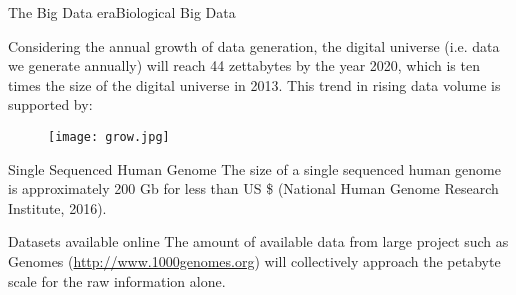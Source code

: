 \documentclass{standalone}
\begin{document}

\begin{frame}{The Big Data era}{Biological Big Data}


  \scriptsize{Considering the annual growth of data generation, the digital universe (i.e. data we generate annually) will reach 44 zettabytes by the year 2020, which is ten times the size of the digital universe in 2013. This trend in rising data volume is supported by:}

  \begin{figure}
    \centering
    \texttt{[image: grow.jpg]}
  \end{figure}

  \begin{exampleblock}{Single Sequenced Human Genome}
    The size of a single sequenced human genome is approximately 200 Gb for less than US \$  (National Human Genome Research Institute, 2016).
  \end{exampleblock}

  \begin{exampleblock}{Datasets available online}
    The amount of available data from large project such as  Genomes (\url{http://www.1000genomes.org}) will collectively approach the petabyte scale for the raw information alone.
  \end{exampleblock}

\end{frame}
\end{document}
